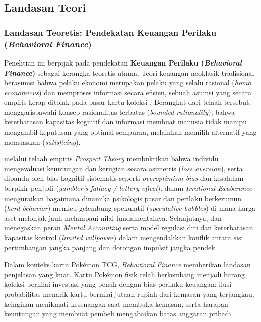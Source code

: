 \documentclass[12pt,a4paper]{article}
\numberwithin{equation}{section}
\numberwithin{table}{section}
\numberwithin{figure}{section}
\begin{document}
\subsection{Landasan Teori}

\subsubsection{Landasan Teoretis: Pendekatan Keuangan Perilaku (\emph{Behavioral Finance})}

Penelitian ini berpijak pada pendekatan \textbf{Keuangan Perilaku (\emph{Behavioral Finance})} sebagai kerangka teoretis utama. Teori keuangan neoklasik tradisional berasumsi bahwa pelaku ekonomi merupakan pelaku yang selalu rasional (\emph{homo economicus}) dan memproses informasi secara efisien, sebuah asumsi yang secara empiris kerap ditolak pada pasar kartu koleksi \citep{aquino2024expecting}. Berangkat dari telaah tersebut, \citet{giarlotta2024simon} menggarisbawahi konsep rasionalitas terbatas (\emph{bounded rationality}), bahwa keterbatasan kapasitas kognitif dan informasi membuat manusia tidak mampu mengambil keputusan yang optimal sempurna, melainkan memilih alternatif yang memuaskan (\emph{satisficing}).

\citet{gachter2022individual} melalui telaah empiris \emph{Prospect Theory} membuktikan bahwa individu mengevaluasi keuntungan dan kerugian secara asimetris (\emph{loss aversion}), serta dipandu oleh bias kognitif sistematis seperti \emph{overoptimism bias} dan kesalahan berpikir penjudi (\emph{gambler's fallacy / lottery effect}). \citet{shiller2000irrational} dalam \emph{Irrational Exuberance} menguraikan bagaimana dinamika psikologis pasar dan perilaku berkerumun (\emph{herd behavior}) memicu gelembung spekulatif (\emph{speculative bubbles}) di mana harga aset melonjak jauh melampaui nilai fundamentalnya. Selanjutnya, \citet{skwara2023effects} dan \citet{baumeister2024selfcontrol} menegaskan peran \emph{Mental Accounting} serta model regulasi diri dan keterbatasan kapasitas kontrol (\emph{limited willpower}) dalam mengendalikan konflik antara sisi pertimbangan jangka panjang dan dorongan impulsif jangka pendek.

Dalam konteks kartu Pok\'emon TCG, \emph{Behavioral Finance} memberikan landasan penjelasan yang kuat. Kartu Pok\'emon fisik telah berkembang menjadi barang koleksi bernilai investasi yang penuh dengan bias perilaku keuangan: ilusi probabilitas menarik kartu bernilai jutaan rupiah dari kemasan yang terjangkau, keinginan menikmati kesenangan saat membuka kemasan, serta harapan keuntungan yang membuat pembeli mengabaikan batas anggaran pribadi.
\end{document}
